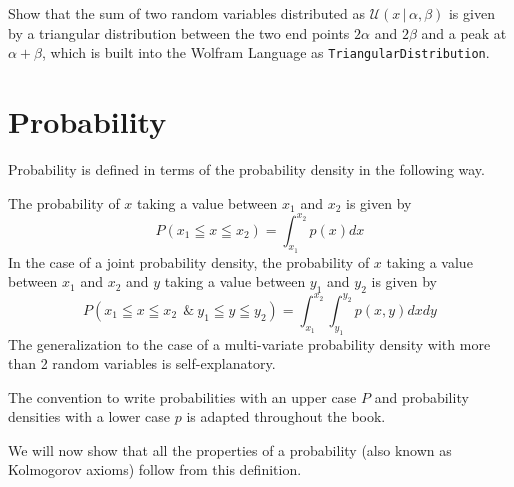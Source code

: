 \documentclass{tstextbook}
\begin{document}
\begin{exercise}
Show that the sum of two random variables distributed as $\mathcal{U}(x\,\vert\,\alpha,\beta)$ is given by a triangular distribution between the two end points $2\alpha$ and $2\beta$ and a peak at $\alpha+\beta$, which is built into the Wolfram Language as \texttt{TriangularDistribution}.
\end{exercise}

\section{Probability}

Probability is defined in terms of the probability density in the following way.

\begin{definition}[Probability]
  \label{th:probability}
  The probability of $x$ taking a value between $x_1$ and $x_2$ is given by
  \begin{equation}
    P(x_1\leqq x\leqq x_2)=\int_{x_1}^{x_2}p(x)dx
  \end{equation}
  In the case of a joint probability density, the probability of $x$ taking a value between $x_1$ and $x_2$ and $y$ taking a value between $y_1$ and $y_2$ is given by
  \begin{equation}
    P(x_1\leqq x\leqq x_2\:\ \& \:y_1\leqq y\leqq y_2)=\int_{x_1}^{x_2}\int_{y_1}^{y_2}p(x,y)dxdy
  \end{equation}
  The generalization to the case of a multi-variate probability density with more than 2 random variables is self-explanatory. 
\end{definition}
The convention to write probabilities with an upper case $P$ and probability densities with a lower case $p$ is adapted throughout the book.

We will now show that all the properties of a probability (also known as Kolmogorov axioms) follow from this definition.
\end{document}
